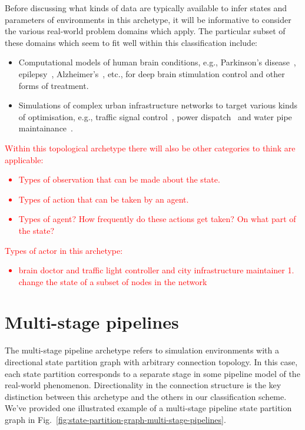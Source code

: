 Before discussing what kinds of data are typically available to infer states and parameters of environments in this archetype, it will be informative to consider the various real-world problem domains which apply. The particular subset of these domains which seem to fit well within this classification include:
\begin{itemize}
\item{Computational models of human brain conditions, e.g., Parkinson's disease~\cite{lu2019application}, epilepsy~\cite{pineau2009treating}, Alzheimer's~\cite{saboo2021reinforcement}, etc., for deep brain stimulation control and other forms of treatment.}
\item{Simulations of complex urban infrastructure networks to target various kinds of optimisation, e.g., traffic signal control~\cite{yau2017survey}, power dispatch~\cite{li2021integrating} and water pipe maintainance~\cite{bukhsh2023maintenance}.}
\end{itemize}

\textcolor{red}{Within this topological archetype there will also be other categories to think are applicable:
\begin{itemize}
\item{Types of observation that can be made about the state.}
\item{Types of action that can be taken by an agent.}
\item{Types of agent? How frequently do these actions get taken? On what part of the state?}
\end{itemize}
}

\textcolor{red}{Types of actor in this archetype:
\begin{itemize}
\item{brain doctor and traffic light controller and city infrastructure maintainer 1. change the state of a subset of nodes in the network}
\end{itemize}}


\section{\sffamily Multi-stage pipelines}

The multi-stage pipeline archetype refers to simulation environments with a directional state partition graph with arbitrary connection topology. In this case, each state partition corresponds to a separate stage in some pipeline model of the real-world phenomenon. Directionality in the connection structure is the key distinction between this archetype and the others in our classification scheme. We've provided one illustrated example of a multi-stage pipeline state partition graph in Fig.~\ref{fig:state-partition-graph-multi-stage-pipelines}.

